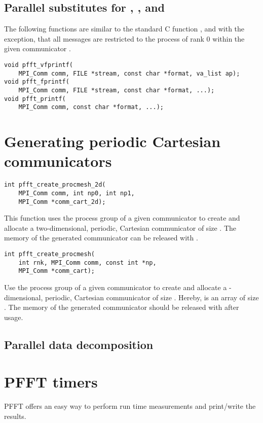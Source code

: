\subsection{Parallel substitutes for , , and }\label{sec:fprintf}
The following functions are similar to the standard C function ,  and  with the exception,
that all messages are restricted to the process of rank $0$ within the given communicator .
\begin{lstlisting}
void pfft_vfprintf(
    MPI_Comm comm, FILE *stream, const char *format, va_list ap);
void pfft_fprintf(
    MPI_Comm comm, FILE *stream, const char *format, ...);
void pfft_printf(
    MPI_Comm comm, const char *format, ...);
\end{lstlisting}

\section{Generating periodic Cartesian communicators}\label{sec:create-comm}
\begin{lstlisting}
int pfft_create_procmesh_2d(
    MPI_Comm comm, int np0, int np1,
    MPI_Comm *comm_cart_2d);
\end{lstlisting}
This function uses the process group of a given communicator  to create and allocate a
two-dimensional, periodic, Cartesian communicator  of size .
The memory of the generated communicator can be released with .
\begin{lstlisting}
int pfft_create_procmesh(
    int rnk, MPI_Comm comm, const int *np,
    MPI_Comm *comm_cart);
\end{lstlisting}
Use the process group of a given communicator  to create and allocate a
-dimensional, periodic, Cartesian communicator of size .
Hereby,  is an array of size .
The memory of the generated communicator should be released with  after usage.

\subsection{Parallel data decomposition}\label{sec:par-data-decomp}



\section{PFFT timers}
PFFT offers an easy way to perform run time measurements and print/write the results.


